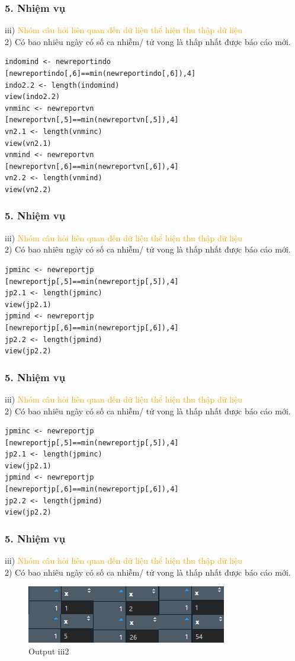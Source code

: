 \documentclass[english,10pt,table]{beamer}
\begin{document}
\begin{frame}[fragile]
\frametitle{5.  Nhiệm vụ}
	iii) \textcolor{orange}{Nhóm câu hỏi liên quan đến dữ liệu thể hiện thu thập dữ liệu}\\%
    2) Có bao nhiêu ngày có số ca nhiễm/ tử vong là thấp nhất được báo cáo mới.
    \begin{lstlisting}[frame=single]  
indomind <- newreportindo
[newreportindo[,6]==min(newreportindo[,6]),4] 
indo2.2 <- length(indomind)
view(indo2.2)
vnminc <- newreportvn
[newreportvn[,5]==min(newreportvn[,5]),4] 
vn2.1 <- length(vnminc)
view(vn2.1)
vnmind <- newreportvn
[newreportvn[,6]==min(newreportvn[,6]),4] 
vn2.2 <- length(vnmind)
view(vn2.2)
	\end{lstlisting}
\end{frame}

\begin{frame}[fragile]
\frametitle{5.  Nhiệm vụ}
	iii) \textcolor{orange}{Nhóm câu hỏi liên quan đến dữ liệu thể hiện thu thập dữ liệu}\\%
    2) Có bao nhiêu ngày có số ca nhiễm/ tử vong là thấp nhất được báo cáo mới.
    \begin{lstlisting}[frame=single]  
jpminc <- newreportjp
[newreportjp[,5]==min(newreportjp[,5]),4] 
jp2.1 <- length(jpminc)
view(jp2.1)
jpmind <- newreportjp
[newreportjp[,6]==min(newreportjp[,6]),4] 
jp2.2 <- length(jpmind)
view(jp2.2)
	\end{lstlisting}
\end{frame}

\begin{frame}[fragile]
\frametitle{5.  Nhiệm vụ}
	iii) \textcolor{orange}{Nhóm câu hỏi liên quan đến dữ liệu thể hiện thu thập dữ liệu}\\%
    2) Có bao nhiêu ngày có số ca nhiễm/ tử vong là thấp nhất được báo cáo mới.
    \begin{lstlisting}[frame=single]  
jpminc <- newreportjp
[newreportjp[,5]==min(newreportjp[,5]),4] 
jp2.1 <- length(jpminc)
view(jp2.1)
jpmind <- newreportjp
[newreportjp[,6]==min(newreportjp[,6]),4] 
jp2.2 <- length(jpmind)
view(jp2.2)
	\end{lstlisting}
\end{frame}

\begin{frame}[fragile]
\frametitle{5.  Nhiệm vụ}
	iii) \textcolor{orange}{Nhóm câu hỏi liên quan đến dữ liệu thể hiện thu thập dữ liệu}\\%
    2) Có bao nhiêu ngày có số ca nhiễm/ tử vong là thấp nhất được báo cáo mới.
	\begin{figure}[h!]
	\begin{center}
		    \includegraphics[scale = 1]{Images/III/iii2.png}
		     \caption{Output iii2}
		\end{center}
		\end{figure}
\end{frame}
\end{document}

